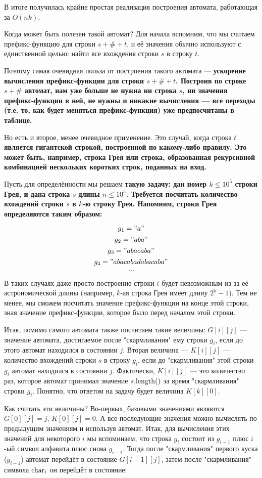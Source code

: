 В итоге получилась крайне простая реализация построения автомата, работающая за $O(n k)$.

Когда может быть полезен такой автомат? Для начала вспомним, что мы считаем префикс-функцию для строки $s+\#+t$, и её значения обычно используют с единственной целью: найти все вхождения строки $s$ в строку $t$.

Поэтому самая очевидная польза от построения такого автомата --- \bf{ускорение вычисления префикс-функции} для строки $s+\#+t$. Построив по строке $s+\#$ автомат, нам уже больше не нужна ни строка $s$, ни значения префикс-функции в ней, не нужны и никакие вычисления --- все переходы (т.е. то, как будет меняться префикс-функция) уже предпосчитаны в таблице.

Но есть и второе, менее очевидное применение. Это случай, когда строка $t$ \bf{является гигантской строкой, построенной по какому-либо правилу}. Это может быть, например, строка Грея или строка, образованная рекурсивной комбинацией нескольких коротких строк, поданных на вход.

Пусть для определённости мы решаем \bf{такую задачу}: дан номер $k \le 10^5$ строки Грея, и дана строка $s$ длины $n \le 10^5$. Требуется посчитать количество вхождений строки $s$ в $k$-ю строку Грея. Напомним, строки Грея определяются таким образом:

$$ g_1 = "a" $$
$$ g_2 = "aba" $$
$$ g_3 = "abacaba" $$
$$ g_4 = "abacabadabacaba" $$
$$ \ldots $$

В таких случаях даже просто построение строки $t$ будет невозможным из-за её астрономической длины (например, $k$-ая строка Грея имеет длину $2^k-1$). Тем не менее, мы сможем посчитать значение префикс-функции на конце этой строки, зная значение префикс-функции, которое было перед началом этой строки.

Итак, помимо самого автомата также посчитаем такие величины: $G[i][j]$ --- значение автомата, достигаемое после "скармливания" ему строки $g_i$, если до этого автомат находился в состоянии $j$. Вторая величина --- $K[i][j]$ --- количество вхождений строки $s$ в строку $g_i$, если до "скармливания" этой строки $g_i$ автомат находился в состоянии $j$. Фактически, $K[i][j]$ --- это количество раз, которое автомат принимал значение $s.{\rm length}()$ за время "скармливания" строки $g_i$. Понятно, что ответом на задачу будет величина $K[k][0]$.

Как считать эти величины? Во-первых, базовыми значениями являются $G[0][j] = j$, $K[0][j] = 0$. А все последующие значения можно вычислять по предыдущим значениям и используя автомат. Итак, для вычисления этих значений для некоторого $i$ мы вспоминаем, что строка $g_i$ состоит из $g_{i-1}$ плюс $i$-ый символ алфавита плюс снова $g_{i-1}$. Тогда после "скармливания" первого куска ($g_{i-1}$) автомат перейдёт в состояние $G[i-1][j]$, затем после "скармливания" символа ${\rm char}_i$ он перейдёт в состояние:

